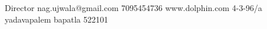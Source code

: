 \documentclass{../src-tex/amm-pst-business-card}
\begin{document}
%
\thispagestyle{empty}%
%
{Director}%
{nag.ujwala@gmail.com}%
{7095454736}%
{www.dolphin.com}%
{4-3-96/a yadavapalem bapatla 522101}%
{ }%
\end{document}

